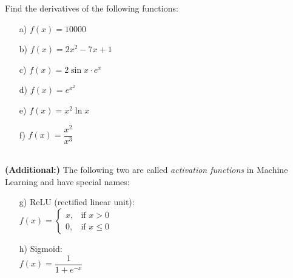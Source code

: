 \medskip





\begin{problem}
Find the derivatives of the following functions:
    \begin{enumerate}
    \item[a) ] $f(x)=10000$

        \item[b) ] $f(x)=2x^2-7x+1$
        
        \item[c) ] $f(x)=2\sin x \cdot e^x$
        
        \item[d) ] $f(x)=e^{x^2}$
        \item[e) ] $f(x)=x^2\ln x$
        \item[f) ] $f(x)=\dfrac{x^2}{x^3}$
    \end{enumerate}
\\\textbf{(Additional:)} The following two  are called \textit{activation functions} in Machine Learning and have special names:
\begin{enumerate}
\item[g) ] ReLU (rectified linear unit):
\\ $f(x) = \begin{cases}
    x, & \text{if } x>0\\
    0, & \text{if } x\le 0
\end{cases}$

\begin{center}
\end{center}

\item[h) ] Sigmoid:
\\ $f(x) = \dfrac{1}{1+e^{-x}}$

\begin{center}
\end{center}
\end{enumerate}
    
\end{problem}

